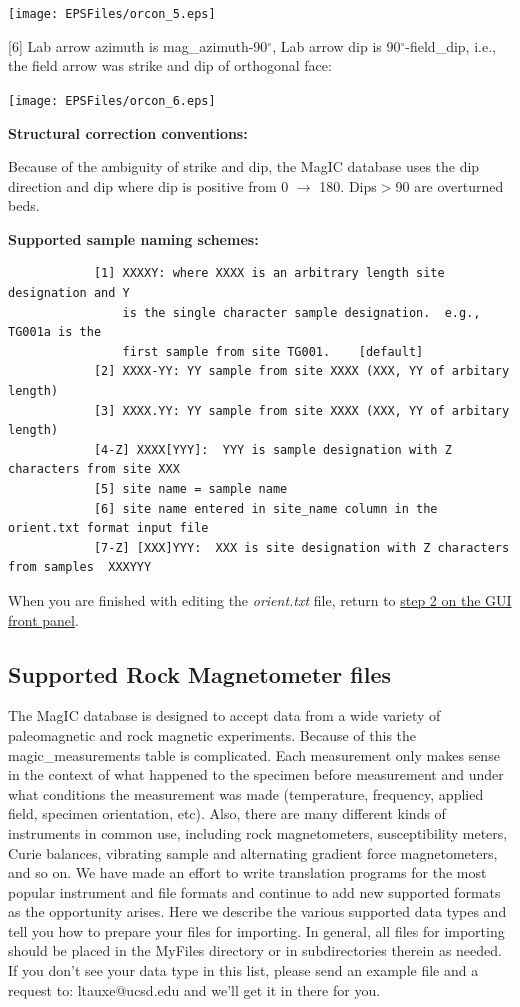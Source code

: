 \documentclass[11pt]{book}
\begin{document}
{{{               \texttt{[image: EPSFiles/orcon\_5.eps]}


 [6] Lab arrow azimuth is mag\_azimuth-90$^{\circ}$, Lab arrow dip is 90$^{\circ}$-field\_dip, i.e., the field arrow was strike and dip of orthogonal face:

                \texttt{[image: EPSFiles/orcon\_6.eps]}
                }

{\bf Structural correction conventions:}


Because of the ambiguity of strike and dip, the MagIC database uses the dip direction and dip where dip is positive from 0 $\rightarrow$ 180. Dips$ > $90 are overturned beds.



{\bf Supported sample naming schemes:}

\begin{verbatim}
            [1] XXXXY: where XXXX is an arbitrary length site designation and Y
                is the single character sample designation.  e.g., TG001a is the
                first sample from site TG001.    [default]
            [2] XXXX-YY: YY sample from site XXXX (XXX, YY of arbitary length)
            [3] XXXX.YY: YY sample from site XXXX (XXX, YY of arbitary length)
            [4-Z] XXXX[YYY]:  YYY is sample designation with Z characters from site XXX
            [5] site name = sample name
            [6] site name entered in site_name column in the orient.txt format input file
            [7-Z] [XXX]YYY:  XXX is site designation with Z characters from samples  XXXYYY
\end{verbatim}

When you are finished with editing the {\it orient.txt} file,  return to  \href{#orient}{step 2 on the GUI front panel}.



\subsection{Supported Rock Magnetometer files}

The MagIC database is designed to accept data from a wide variety of paleomagnetic and rock magnetic experiments. Because of this the magic\_measurements table is complicated. Each measurement only makes sense in the context of what happened to the specimen before measurement and under what conditions the measurement was made (temperature, frequency, applied field, specimen orientation, etc). Also, there are many different kinds of instruments in common use, including rock magnetometers, susceptibility meters, Curie balances, vibrating sample and alternating gradient force magnetometers, and so on. We have made an effort to write translation programs for the most popular instrument and file formats and continue to add new supported formats as the opportunity arises. Here we describe the various supported data types and tell you how to prepare your files for importing. In general, all files for importing should be placed in the MyFiles directory or in subdirectories therein as needed.  If you don't see your data type in this list, please send an example file and a request to:  ltauxe@ucsd.edu and we'll get it in there for you.


}}
\end{document}
